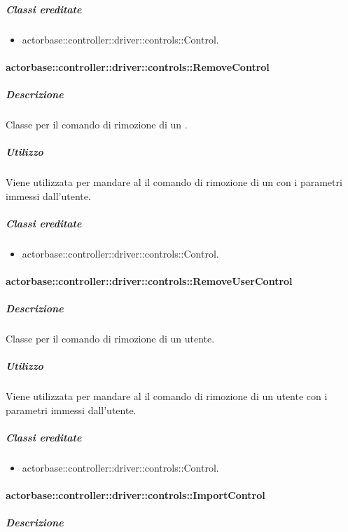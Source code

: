 \documentclass{scalatekids-article}
\begin{document}
\subparagraph{Classi ereditate}

\begin{itemize}
\item actorbase::controller::driver::controls::Control.
\end{itemize}

\paragraph{actorbase::controller::driver::controls::RemoveControl}

\subparagraph{Descrizione}

Classe per il comando di rimozione di un .

\subparagraph{Utilizzo}

Viene utilizzata per mandare al  il comando di rimozione di un  con i parametri immessi dall'utente.

\subparagraph{Classi ereditate}

\begin{itemize}
\item actorbase::controller::driver::controls::Control.
\end{itemize}

\paragraph{actorbase::controller::driver::controls::RemoveUserControl}

\subparagraph{Descrizione}

Classe per il comando di rimozione di un utente.

\subparagraph{Utilizzo}

Viene utilizzata per mandare al  il comando di rimozione di un utente con i parametri immessi dall'utente.

\subparagraph{Classi ereditate}

\begin{itemize}
\item actorbase::controller::driver::controls::Control.
\end{itemize}

\paragraph{actorbase::controller::driver::controls::ImportControl}

\subparagraph{Descrizione}
\end{document}
